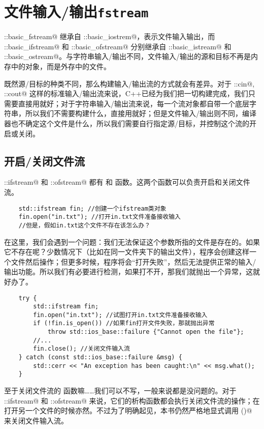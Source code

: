 \section{文件输入/输出\texttt{fstream}}
\lstinline@std::basic_fstream@ 继承自 \lstinline@std::basic_iostrem@，表示文件输入输出，而 \lstinline@std::basic_ifstream@ 和 \lstinline@std::basic_ofstream@ 分别继承自 \lstinline@std::basic_istream@ 和 \lstinline@std::basic_ostream@。与字符串输入/输出不同，文件输入/输出的源和目标不再是内存中的对象，而是外存中的文件。\par
既然源/目标的种类不同，那么构建输入/输出流的方式就会有差异。对于 \lstinline@std::cin@, \lstinline@std::cout@ 这样的标准输入/输出流来说，C++已经为我们把一切构建完成，我们只需要直接用就好；对于字符串输入/输出流来说，每一个流对象都自带一个底层字符串，所以我们不需要构建什么，直接用就好；但是文件输入/输出则不同，编译器也不确定这个文件是什么，所以我们需要自行指定源/目标，并控制这个流的开启或关闭。
\subsection*{开启/关闭文件流}
\lstinline@std::ifstream@ 和 \lstinline@std::ofstream@ 都有 \lstinline@open@ 和 \lstinline@close@ 函数。这两个函数可以负责开启和关闭文件流。\par
\begin{lstlisting}
    std::ifstream fin; //创建一个ifstream类对象
    fin.open("in.txt"); //打开in.txt文件准备接收输入
    //但是，假如in.txt这个文件不存在该怎么办？
\end{lstlisting}\par
在这里，我们会遇到一个问题：我们无法保证这个参数所指的文件是存在的。如果它不存在呢？少数情况下（比如在同一文件夹下的输出文件），程序会创建这样一个文件然后操作；但更多时候，程序将会``打开失败''，然后无法提供正常的输入/输出功能。所以我们有必要进行检测，如果打不开，那我们就抛出一个异常，这就好办了。
\begin{lstlisting}
    try {
        std::ifstream fin;
        fin.open("in.txt"); //试图打开in.txt文件准备接收输入
        if (!fin.is_open()) //如果fin打开文件失败，那就抛出异常
            throw std::ios_base::failure {"Cannot open the file"};
        //...
        fin.close(); //关闭文件输入流
    } catch (const std::ios_base::failure &msg) {
        std::cerr << "An exception has been caught:\n" << msg.what();
    }
\end{lstlisting}\par
至于关闭文件流的 \lstinline@close@ 函数嘛……我们可以不写，一般来说都是没问题的。对于 \lstinline@std::ifstream@ 和 \lstinline@std::ofstream@ 来说，它们的析构函数都会执行关闭文件流的操作；在打开另一个文件的时候亦然。不过为了明确起见，本书仍然严格地显式调用 \lstinline@close()@ 来关闭文件输入流。\par
